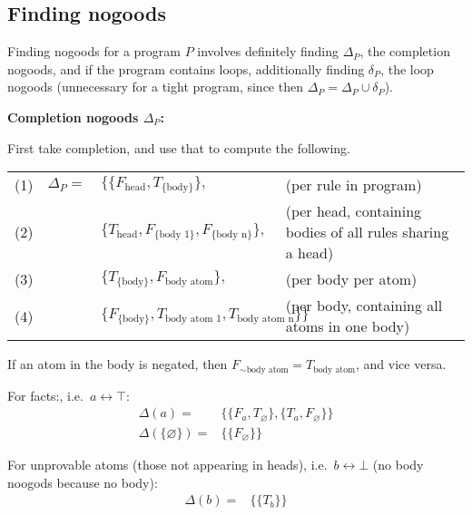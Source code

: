 \documentclass[9pt,a4paper,landscape]{article}
\newcommand{\ngtb}[1]{T_{ \{#1\} }}
\newcommand{\ngfb}[1]{F_{ \{#1\} }}
\newcommand{\ngta}[1]{T_{#1}}
\newcommand{\ngfa}[1]{F_{#1}}
\begin{document}
{%

\subsection{Finding nogoods}
\label{subsec:ng}

Finding nogoods for a program $P$ involves definitely finding $\Delta_P$, the completion nogoods, and if the program contains loops, additionally finding $\delta_P$, the loop nogoods (unnecessary for a tight program, since then $\Delta_P = \Delta_P \cup \delta_P$).

\vspace{\baselineskip}
\textbf{Completion nogoods $\Delta_P$:}

First take completion, and use that to compute the following.

\begin{center}
	\begin{tabular}{lrll}
	(1) & $\Delta_P =$ 	& $\{ \{ \ngfa{\text{head}}, \ngtb{\text{body}} \},$ & (per rule in program) \\
	(2) &				& $\{ \ngta{\text{head}}, \ngfb{\text{body 1}}, \ngfb{\text{body n}} \},$ & (per head, containing bodies of all rules sharing a head) \\
	(3) &				& $\{ \ngtb{\text{body}}, \ngfa{\text{body atom}} \},$ & (per body per atom)\\
	(4) &				& $\{ \ngfb{\text{body}}, \ngta{\text{body atom 1}}, \ngta{\text{body atom n}} \} \}$ & (per body, containing all atoms in one body)
\end{tabular}
\end{center}

If an atom in the body is negated, then $\ngfa{{\sim} \text{body atom}} = \ngta{\text{body atom}}$, and vice versa.

For facts:, i.e.\ $a \leftrightarrow \top$:
\begin{align*}
\Delta (a) = & \{ \{ \ngfa{a}, \ngta{\varnothing} \}, \{ \ngta{a}, \ngfa{\varnothing} \} \} \\
\Delta (\{\varnothing\}) = & \{ \{ \ngfa{\varnothing} \} \}
\end{align*}

For unprovable atoms (those not appearing in heads), i.e.\ $b \leftrightarrow \bot$ (no body noogods because no body):
\begin{align*}
\Delta (b) = & \{ \{ \ngta{b} \} \} \\
\end{align*}

}
\end{document}
